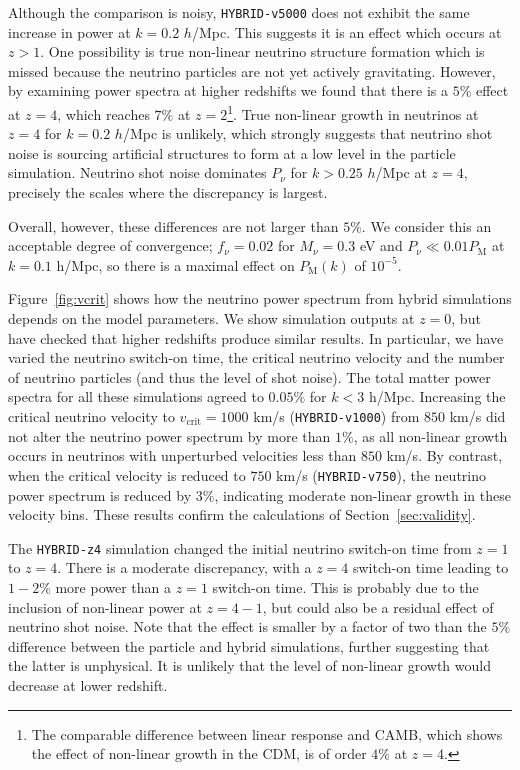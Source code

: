 \documentclass[useAMS, usenatbib]{mnras}
\begin{document}
Although the comparison is noisy, \texttt{HYBRID-v5000} does not exhibit the same increase in power at $k=0.2$ $h$/Mpc. This suggests it is an effect which occurs at $z > 1$. One possibility is true non-linear neutrino structure formation which is missed because the neutrino particles are not yet actively gravitating. However, by examining power spectra at higher redshifts we found that there is a $5\%$ effect at $z=4$, which reaches $7\%$ at $z=2$\footnote{The comparable difference between linear response and CAMB, which shows the effect of non-linear growth in the CDM, is of order $4\%$ at $z=4$.}. True non-linear growth in neutrinos at $z=4$ for $k = 0.2$ $h$/Mpc is unlikely, which strongly suggests that neutrino shot noise is sourcing artificial structures to form at a low level in the particle simulation. Neutrino shot noise dominates $P_\nu$ for $k > 0.25$ $h$/Mpc at $z=4$, precisely the scales where the discrepancy is largest.

Overall, however, these differences are not larger than $5\%$. We consider this an acceptable degree of convergence; $f_\nu = 0.02$ for $M_\nu = 0.3$ eV and $P_\nu \ll 0.01 P_\mathrm{M}$ at $k = 0.1$ h/Mpc, so there is a maximal effect on $P_\mathrm{M}(k)$ of $10^{-5}$.

Figure~\ref{fig:vcrit} shows how the neutrino power spectrum from hybrid simulations depends on the model parameters. We show simulation outputs at $z=0$, but have checked that higher redshifts produce similar results. In particular, we have varied the neutrino switch-on time, the critical neutrino velocity and the number of neutrino particles (and thus the level of shot noise). The total matter power spectra for all these simulations agreed to $0.05\%$ for $k < 3$ h/Mpc. Increasing the critical neutrino velocity to $v_\mathrm{crit} = 1000$ km/s (\texttt{HYBRID-v1000}) from $850$ km/s did not alter the neutrino power spectrum by more than $1\%$, as all non-linear growth occurs in neutrinos with unperturbed velocities less than $850$ km/s. By contrast, when the critical velocity is reduced to $750$ km/s (\texttt{HYBRID-v750}), the neutrino power spectrum is reduced by $3\%$, indicating moderate non-linear growth in these velocity bins. These results confirm the calculations of Section~\ref{sec:validity}.

The \texttt{HYBRID-z4} simulation changed the initial neutrino switch-on time from $z=1$ to $z=4$. There is a moderate discrepancy, with a $z=4$ switch-on time leading to $1-2\%$ more power than a $z=1$ switch-on time. This is probably due to the inclusion of non-linear power at $z = 4-1$, but could also be a residual effect of neutrino shot noise. Note that the effect is smaller by a factor of two than the $5\%$ difference between the particle and hybrid simulations, further suggesting that the latter is unphysical. It is unlikely that the level of non-linear growth would decrease at lower redshift.
\end{document}
